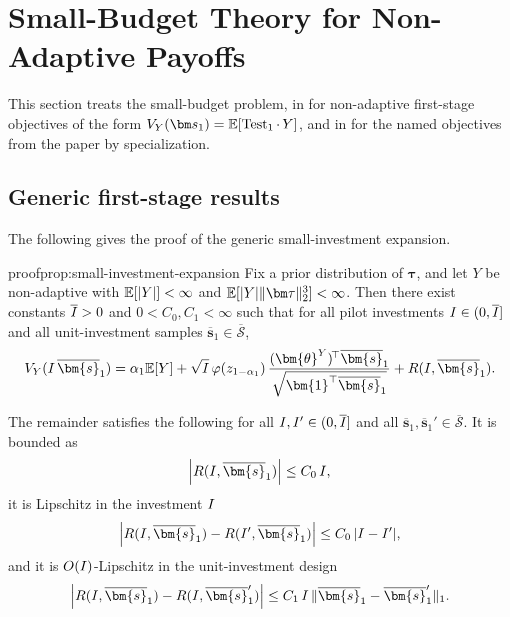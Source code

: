 \section{Small-Budget Theory for Non-Adaptive Payoffs}
\label{sec:small-budget-first-stage-objectives-appendix}

This section treats the small-budget problem, in  for non-adaptive first-stage objectives of the form $V_Y(\bm s_1)=\E[\Test_1\cdot\, Y]$, and in  for the named objectives from the paper by specialization.

\subsection{Generic first-stage results}
\label{sec:generic-first-stage-results-appendix}

The following gives the proof of the generic small-investment expansion.
\begin{linkedresult}{proof}{prop:small-investment-expansion}
  \label{prop:small-investment-expansion-appendix}
  Fix a prior distribution of $\bm\tau$, and let $Y$ be non-adaptive with $\mathbb{E}[|Y|]<\infty$ and $\E[|Y|\|\bm\tau\|_2^3]<\infty$.
  Then there exist constants $\overline{I}>0$ and $0<C_0,C_1<\infty$ such that for all pilot investments $I\in(0,\overline{I}]$ and all unit-investment samples $\overline{\bm{s}}_1\in\overline{\mathcal{S}}$,
  \[
    V_Y(\invst\,\overline{\bm{s}}_1)
    =
    \alpha_1 \E[Y]
    +\sqrt{\invst}\,\varphi(z_{1-\alpha_1})\,
    \frac{(\bm{\theta}^Y)^{\!\top}\overline{\bm{s}}_1}{\sqrt{\bm{1}^{\top}\overline{\bm{s}}_1}}
    +R(\invst,\overline{\bm{s}}_1).
  \]

  The remainder satisfies the following for all $I, I'\in(0,\overline{I}]$ and all $\overline{\bm{s}}_1,\overline{\bm{s}}_1'\in\overline{\mathcal{S}}$.
  It is bounded as
  \[
    \left|R(\invst,\overline{\bm{s}}_1)\right|
    \le C_0\,\invst,
  \]
  it is Lipschitz in the investment $I$
  \[
    \left|R(\invst,\overline{\bm{s}}_1)-R(\invst',\overline{\bm{s}}_1)\right|
    \le C_0\,|\invst-\invst'|,
  \]
  and it is $O(I)$-Lipschitz in the unit-investment design
  \[
    \left|R(\invst,\overline{\bm{s}}_1)-R(\invst,\overline{\bm{s}}_1')\right|
    \le C_1\,\invst\,\|\overline{\bm{s}}_1-\overline{\bm{s}}_1'\|_1.
  \]
\end{linkedresult}

